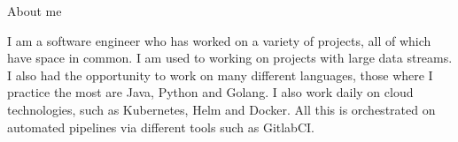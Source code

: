 \documentclass[
	11pt, %
]{resume}
\begin{document}

\begin{rSection}{About me}

	I am a software engineer who has worked on a variety of projects, all of which have space in common. 
	I am used to working on projects with large data streams. I also had the opportunity to work on many different languages, those where I practice the most are Java, Python and Golang. 
	I also work daily on cloud technologies, such as Kubernetes, Helm and Docker. All this is orchestrated on automated pipelines via different tools such as GitlabCI.

\end{rSection}
\end{document}
